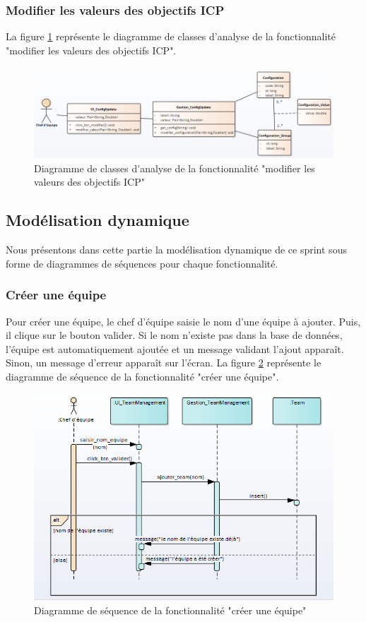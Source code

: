 \subsubsection{Modifier les valeurs des objectifs ICP}
La figure \ref{code69} représente le diagramme de classes d'analyse de la fonctionnalité "modifier les valeurs des objectifs ICP".
\begin{figure}[H]
  \centering
 \includegraphics[scale=0.69]{figures/diagrams/class/config_class_diag.png}
 \caption{Diagramme de classes d'analyse de la fonctionnalité "modifier les valeurs des objectifs ICP"}
 \label{code69}
\end{figure}

\subsection{Modélisation dynamique}
Nous présentons dans cette partie la modélisation dynamique de ce sprint sous forme de diagrammes de séquences pour chaque fonctionnalité.

\subsubsection{Créer une équipe}
Pour créer une équipe, le chef d'équipe saisie le nom d'une équipe à ajouter. Puis, il clique sur le bouton valider. Si le nom n'existe pas dans la base de données, l'équipe est automatiquement ajoutée et un message validant l'ajout apparaît. Sinon, un message d'erreur apparaît sur l'écran.
La figure \ref{code70} représente le diagramme de séquence de la fonctionnalité "créer une équipe".
\begin{figure}[H]
  \centering
 \includegraphics[scale=0.69]{figures/diagrams/sequence/createteam_seq_diag.png}
 \caption{Diagramme de séquence de la fonctionnalité "créer une équipe"}
 \label{code70}
\end{figure}

